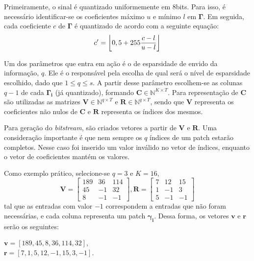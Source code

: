 \documentclass[cic,tc]{iiufrgs}
\renewcommand{\vec}[1]{\bm{#1}}
\newcommand{\mat}[1]{\bm{#1}}
\DeclarePairedDelimiter{\floor}{\lfloor}{\rfloor}
\begin{document}
Primeiramente, o sinal é quantizado uniformemente em 8bits. 
Para isso, é necessário identificar-se os coeficientes máximo $u$ e mínimo $l$ em $\mat{\Gamma}$.
Em seguida, cada coeficiente $c$ de $\mat{\Gamma}$ é quantizado de acordo com a seguinte equação:
\begin{equation*}
    c' = \floor*{0,5 + 255\frac{c - l}{u - l}}
\end{equation*}

Um dos parâmetros que entra em ação é o de esparsidade de envido da informação, $q$. 
Ele é o responsável pela escolha de qual será o nível de esparsidade escolhido,
dado que $1 \le q \le s$.
A partir desse parâmetro escolhem-se as colunas $q-1$ de cada $\mat{\Gamma_i}$ (já quantizado), 
formando $\mat{C} \in \mathbb{N}^{K \times T}$.
Para representação de $\mat{C}$ são utilizadas as matrizes $\mat{V} \in \mathbb{N}^{q \times T}$ e
$\mat{R} \in \mathbb{N}^{q \times T}$, sendo que $\mat{V}$ representa os coeficientes não nulos de
$\mat{C}$ e $\mat{R}$ representa os índices dos mesmos.

Para geração do \textit{bitstream}, são criados vetores a partir de $\mat{V}$ e $\mat{R}$.
Uma consideração importante é que nem sempre os $q$ índices de um patch estarão completos.
Nesse caso foi inserido um valor inválido no vetor de índices, enquanto o vetor de coeficientes
mantém os valores.

Como exemplo prático, selecione-se $q=3$ e $K=16$,
\begin{equation*}
    \mat{V} = 
    \begin{bmatrix}
        189 & 36 & 114 \\
        45  & -1 & 32  \\
        8   & -1 & -1
    \end{bmatrix},
    \mat{R} = 
    \begin{bmatrix}
        7 & 12 & 15 \\
        1  & -1 & 3  \\
        5   & -1 & -1
    \end{bmatrix}
\end{equation*}
tal que as entradas com valor $-1$ correspondem a entradas que não foram necessárias, 
e cada coluna representa um patch $\vec{\gamma_i}$. 
Dessa forma, os vetores $\vec{v}$ e $\vec{r}$ serão os seguintes: 
\begin{center}
    $\vec{v} = \left[ 189, 45, 8, 36, 114, 32 \right]$, \\
    $\vec{r} = \left[ 7,1,5,12,-1,15,3,-1 \right]$.
\end{center}
\end{document}
